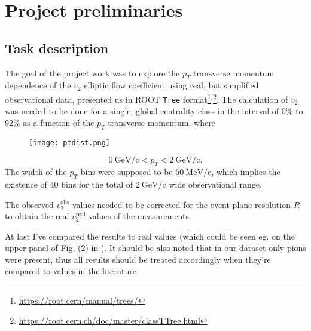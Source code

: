 \section{Project preliminaries} \label{sec:2}
\subsection{Task description} \label{subsec:2.1}
The goal of the project work was to explore the $p_{T}$ transverse momentum dependence of the $v_{2}$ elliptic flow coefficient using real, but simplified observational data, presented us in ROOT \texttt{Tree} format\footnote{\url{https://root.cern/manual/trees/}}$^{,}$\footnote{\url{https://root.cern.ch/doc/master/classTTree.html}}. The calculation of $v_{2}$ was needed to be done for a single, global centrality class in the interval of $0\%$ to $92\%$ as a function of the $p_{T}$ transverse momentum, where

\begin{figure}[t]
	\centering
	\texttt{[image: ptdist.png]}
	\label{fig:1}
\end{figure}

\begin{equation*}
	0\ \mathrm{GeV}/\mathrm{c} < p_{T} < 2\ \mathrm{GeV}/\mathrm{c}.
\end{equation*}
The width of the $p_{T}$ bins were supposed to be $50\ \mathrm{MeV}/\mathrm{c}$, which implies the existence of $40$ bins for the total of $2\ \mathrm{GeV}/\mathrm{c}$ wide observational range.

The observed $v_{2}^{\mathrm{obs}}$ values needed to be corrected for the event plane resolution $R$ to obtain the real $v_{2}^{\mathrm{real}}$ values of the measurements.

At last I've compared the results to real values (which could be seen eg. on the upper panel of Fig. (2) in \citep{Collaboration2003}). It should be also noted that in our dataset only pions were present, thus all results should be treated accordingly when they're compared to values in the literature.

